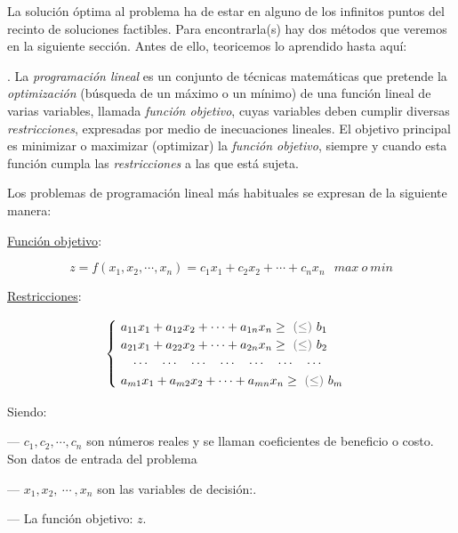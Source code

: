 \vspace{5mm} %
La solución óptima al problema ha de estar en  alguno de los infinitos puntos del recinto de soluciones factibles. Para encontrarla(s) hay dos métodos que veremos en la siguiente sección. Antes de ello, teoricemos lo aprendido hasta aquí:

\vspace{10mm}%
\begin{definition}
. La \emph{programación lineal} es un conjunto de técnicas matemáticas que pretende la \emph{optimización} (búsqueda de un máximo o un mínimo) de una función lineal de varias variables, llamada \emph{función objetivo}, cuyas variables deben cumplir diversas \emph{restricciones}, expresadas por medio de inecuaciones lineales. El objetivo principal es minimizar o maximizar (optimizar) la \emph{función objetivo}, siempre y cuando esta función cumpla las \emph{restricciones} a las que está sujeta.	

\vspace{2mm} Los problemas de programación lineal más habituales se expresan de  la siguiente manera:

\vspace{4mm} \underline{Función objetivo}:

$$z=f(x_1,x_2, \cdots ,x_n)=c_1x_1+c_2x_2+\cdots +c_nx_n \; \  \ max\ o \ min$$

\underline{Restricciones}:

$$\begin{cases}
\ a_{11}x_1+a_{12}x_2+\cdots + a_{1n}x_n \ge \ \textcolor{gris}{(\le)} \ b_1 \\
\ a_{21}x_1+a_{22}x_2+\cdots + a_{2n}x_n \ge \ \textcolor{gris}{(\le)} \ b_2 \\	
\ \quad \cdots \quad \cdots \quad \cdots \quad \cdots \quad \cdots \quad \cdots \quad \cdots \\
\ a_{m1}x_1+a_{m2}x_2+\cdots + a_{mn}x_n \ge \ \textcolor{gris}{(\le)} \ b_m \\
\end{cases}$$


Siendo:

\begin{adjustwidth}{20pt}{10pt}
--- $c_1, c_2, \cdots , c_n$ son números reales y se llaman coeficientes de beneficio o costo. Son datos de entrada del problema

--- $x_1, x_2, \ \cdots \ , x_n$ son las variables de decisión:.

--- La función objetivo: $z$.


\end{adjustwidth}
\end{definition}
